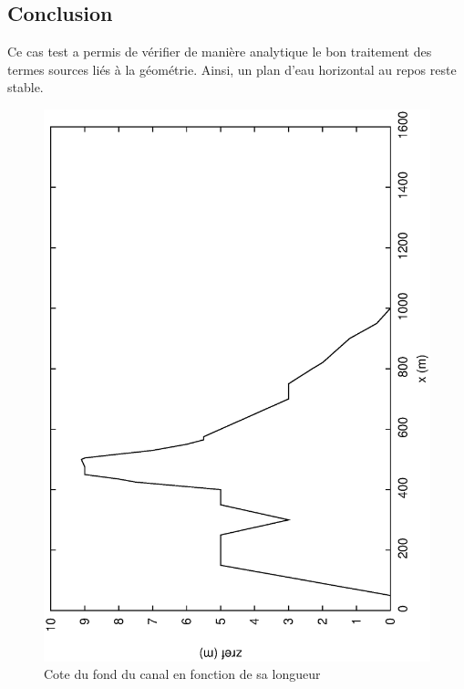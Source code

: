\documentclass[a4paper,10pt]{article}
\begin{document}
\subsection*{Conclusion}

Ce cas test a permis de vérifier de manière analytique le bon traitement des termes sources liés à la géométrie. Ainsi, un plan d'eau horizontal au repos reste stable.

\newpage

\begin{figure}
 \begin{center}
  \includegraphics[angle=270,width=15cm]{cote_fond.eps}
  \caption{Cote du fond du canal en fonction de sa longueur}
  \label{fig1}
 \end{center}
\end{figure}
\end{document}
